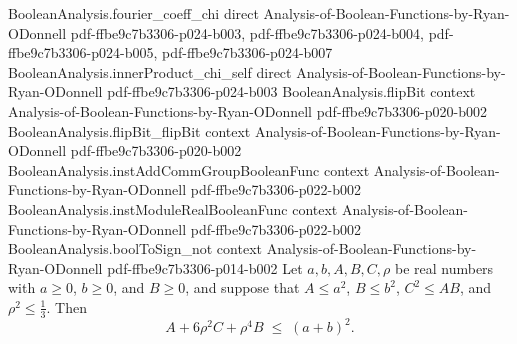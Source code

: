 \begin{lemma}
\proofstep
  {BooleanAnalysis.fourier_coeff_chi}
  {direct}
  {Analysis-of-Boolean-Functions-by-Ryan-ODonnell}
  {pdf-ffbe9c7b3306-p024-b003,
    pdf-ffbe9c7b3306-p024-b004,
    pdf-ffbe9c7b3306-p024-b005,
    pdf-ffbe9c7b3306-p024-b007}
\proofstep
  {BooleanAnalysis.innerProduct_chi_self}
  {direct}
  {Analysis-of-Boolean-Functions-by-Ryan-ODonnell}
  {pdf-ffbe9c7b3306-p024-b003}
\proofstep
  {BooleanAnalysis.flipBit}
  {context}
  {Analysis-of-Boolean-Functions-by-Ryan-ODonnell}
  {pdf-ffbe9c7b3306-p020-b002}
\proofstep
  {BooleanAnalysis.flipBit_flipBit}
  {context}
  {Analysis-of-Boolean-Functions-by-Ryan-ODonnell}
  {pdf-ffbe9c7b3306-p020-b002}
\proofstep
  {BooleanAnalysis.instAddCommGroupBooleanFunc}
  {context}
  {Analysis-of-Boolean-Functions-by-Ryan-ODonnell}
  {pdf-ffbe9c7b3306-p022-b002}
\proofstep
  {BooleanAnalysis.instModuleRealBooleanFunc}
  {context}
  {Analysis-of-Boolean-Functions-by-Ryan-ODonnell}
  {pdf-ffbe9c7b3306-p022-b002}
\proofstep
  {BooleanAnalysis.boolToSign_not}
  {context}
  {Analysis-of-Boolean-Functions-by-Ryan-ODonnell}
  {pdf-ffbe9c7b3306-p014-b002}
\label{BooleanAnalysis.Hypercontractivity.hypercontractivity_algebra'}
Let $a,b,A,B,C,\rho$ be real numbers with $a\ge 0$, $b\ge 0$, and $B\ge 0$, and suppose
that $A\le a^2$, $B\le b^2$, $C^2\le AB$, and $\rho^2\le \tfrac13$. Then
\[
  A + 6\rho^2 C + \rho^4 B \;\le\; (a+b)^2 .
\]
\end{lemma}

